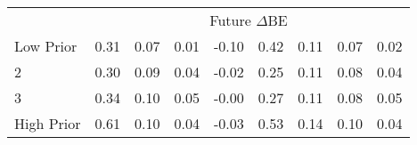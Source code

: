 \begin{table}[!ht]
\begin{tabular}{lrrrrrrrr}
  
    & \multicolumn{8}{c}{Future $\Delta\text{BE}$}  \\
     \cmidrule(r){2-5} \cmidrule(r){6-9}
    Low Prior  & 0.31  & 0.07  & 0.01  & -0.10  & 0.42  & 0.11  & 0.07  & 0.02   \\
    2  & 0.30  & 0.09  & 0.04  & -0.02  & 0.25  & 0.11  & 0.08  & 0.04   \\
    3  & 0.34  & 0.10  & 0.05  & -0.00  & 0.27  & 0.11  & 0.08  & 0.05   \\
    High Prior  & 0.61  & 0.10  & 0.04  & -0.03  & 0.53  & 0.14  & 0.10  & 0.04   \\
    
  
  \bottomrule
\end{tabular}
\label{tbl:Size_BMm_Prior_chars}
\end{table}